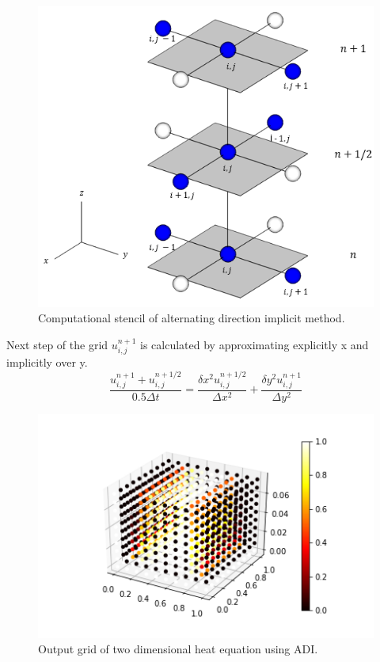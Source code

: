 \documentclass[12pt, oneside]{book}
\theoremstyle{plain}
\theoremstyle{definition}
\begin{document}
\begin{figure}[!htb]
    \centering
        \includegraphics[scale=0.7]{ADI.png}
    \caption{Computational stencil of alternating direction implicit method.}
\end{figure}

Next step of the grid $u^{n+1}_{i,j}$ is calculated by approximating explicitly x and implicitly over y.
\begin{equation}
\frac{u^{n+1}_{i,j} + u^{n+1/2}_{i,j}}{0.5 \Delta t} = \frac{\delta x^2 u^{n+1/2}_{i,j} }{\Delta x^2} + \frac{\delta y^2 u^{n+1}_{i,j}}{\Delta y^2}
\end{equation}

\begin{figure}[!htb]
    \centering
        \includegraphics[scale=0.6]{ADIHeat.png}
    \caption{Output grid of two dimensional heat equation using ADI.}
\end{figure}
\end{document}
